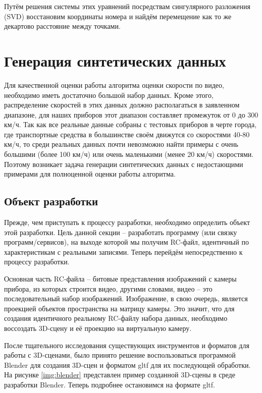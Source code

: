 \documentclass[specification,annotation,times]{itmo-student-thesis}
\begin{document}
	Путём решения системы  этих уравнений посредствам сингулярного разложения (SVD) восстановим координаты номера и найдём перемещение как то же декартово расстояние между точками.
	
	
	
	
	\section{Генерация синтетических данных}
	Для качественной оценки работы алгоритма оценки скорости по видео, необходимо иметь достаточно большой набор данных. Кроме этого, распределение скоростей в этих данных должно располагаться в заявленном диапазоне, для наших приборов этот диапазон составляет промежуток от 0 до 300 км/ч. Так как все реальные данные собраны с тестовых приборов в черте города, где транспортные средства в большинстве своём движутся со скоростями 40-80 км/ч, то среди реальных данных почти невозможно найти примеры с очень большими (более 100 км/ч) или очень маленькими (менее 20 км/ч) скоростями. Поэтому возникает задача генерации синтетических данных с недостающими примерами для полноценной оценки работы алгоритма.
	
	\subsection{Объект разработки}
	Прежде, чем приступать к процессу разработки, необходимо определить объект этой разработки. Цель данной секции – разработать программу (или связку программ/сервисов), на выходе которой мы получим RC-файл, идентичный по характеристикам с реальными записями. Теперь перейдём непосредственно к процессу разработки.
	
	Основная часть RC-файла – битовые представления изображений с камеры прибора, из которых строится видео, другими словами, видео – это последовательный набор изображений. Изображение, в свою очередь, является проекцией объектов пространства на матрицу камеры. Это значит, что для создания идентичного реальному RC-файлу набора данных, необходимо воссоздать 3D-сцену и её проекцию на виртуальную камеру.
	
	После тщательного исследования существующих инструментов и форматов для работы с 3D-сценами, было принято решение воспользоваться программой Blender для создания 3D-сцен и форматом gltf для их последующей обработки. На рисунке \ref{img:blender} представлен пример созданной 3D-сцены в среде разработки Blender. Теперь подробнее остановимся на формате gltf.
	
\end{document}
